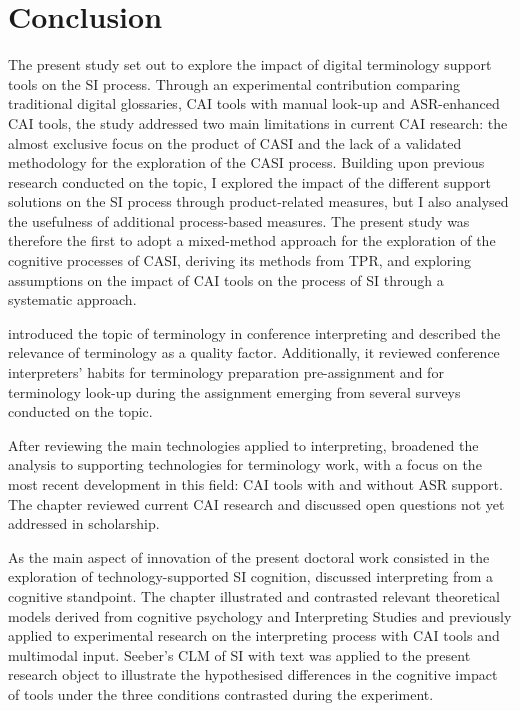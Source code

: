 \chapter{Conclusion}\label{conclusions}\largerpage[2]

The present study set out to explore the impact of digital terminology support tools on the SI process. Through an experimental contribution comparing traditional digital glossaries, CAI tools with manual look-up and ASR-enhanced CAI tools, the study addressed two main limitations in current CAI research: the almost exclusive focus on the product of CASI and the lack of a validated methodology for the exploration of the CASI process. Building upon previous research conducted on the topic, I explored the impact of the different support solutions on the SI process through product-related measures, but I also analysed the usefulness of additional process-based measures. The present study was therefore the first to adopt a mixed-method approach for the exploration of the cognitive processes of CASI, deriving its methods from TPR, and exploring assumptions on the impact of CAI tools on the process of SI through a systematic approach.

 introduced the topic of terminology in conference interpreting and described the relevance of terminology as a quality factor. Additionally, it reviewed conference interpreters' habits for terminology preparation pre-as\-sign\-ment and for terminology look-up during the assignment emerging from several surveys conducted on the topic.

\begin{sloppypar}
After reviewing the main technologies applied to interpreting,  broadened the analysis to supporting technologies for terminology work, with a focus on the most recent development in this field: CAI tools with and without ASR support. The chapter reviewed current CAI research and discussed open questions not yet addressed in scholarship.
\end{sloppypar}

As the main aspect of innovation of the present doctoral work consisted in the exploration of technology-supported SI cognition,  discussed interpreting from a cognitive standpoint. The chapter illustrated and contrasted relevant theoretical models derived from cognitive psychology and Interpreting Studies and previously applied to experimental research on the interpreting process with CAI tools and multimodal input. Seeber's CLM of SI with text was applied to the present research object to illustrate the hypothesised differences in the cognitive impact of tools under the three conditions contrasted during the experiment.

